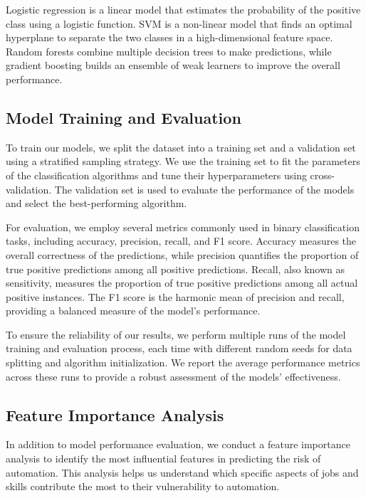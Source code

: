 \documentclass{article}
\begin{document}
Logistic regression is a linear model that estimates the probability of the positive class using a logistic function. SVM is a non-linear model that finds an optimal hyperplane to separate the two classes in a high-dimensional feature space. Random forests combine multiple decision trees to make predictions, while gradient boosting builds an ensemble of weak learners to improve the overall performance.

\subsection{Model Training and Evaluation}

To train our models, we split the dataset into a training set and a validation set using a stratified sampling strategy. We use the training set to fit the parameters of the classification algorithms and tune their hyperparameters using cross-validation. The validation set is used to evaluate the performance of the models and select the best-performing algorithm.

For evaluation, we employ several metrics commonly used in binary classification tasks, including accuracy, precision, recall, and F1 score. Accuracy measures the overall correctness of the predictions, while precision quantifies the proportion of true positive predictions among all positive predictions. Recall, also known as sensitivity, measures the proportion of true positive predictions among all actual positive instances. The F1 score is the harmonic mean of precision and recall, providing a balanced measure of the model's performance.

To ensure the reliability of our results, we perform multiple runs of the model training and evaluation process, each time with different random seeds for data splitting and algorithm initialization. We report the average performance metrics across these runs to provide a robust assessment of the models' effectiveness.

\subsection{Feature Importance Analysis}

In addition to model performance evaluation, we conduct a feature importance analysis to identify the most influential features in predicting the risk of automation. This analysis helps us understand which specific aspects of jobs and skills contribute the most to their vulnerability to automation.
\end{document}
